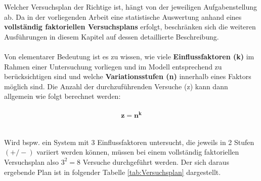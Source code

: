 \documentclass[
fontsize=10pt, 
listof = totoc,
parskip = half	
]{report}
\begin{document}
\noindent Welcher Versuchsplan der Richtige ist, hängt von der jeweiligen Aufgabenstellung ab. Da in der vorliegenden Arbeit eine statistische Auswertung anhand eines \textbf{vollständig faktoriellen Versuchsplans} erfolgt, beschränken sich die weiteren Ausführungen in diesem Kapitel auf dessen detaillierte Beschreibung.
\\\\
\noindent Von elementarer Bedeutung ist es zu wissen, wie viele \textbf{Einflussfaktoren (k)} im Rahmen einer Untersuchung vorliegen und im Modell entsprechend zu berücksichtigen sind und welche \textbf{Variationsstufen (n)} innerhalb eines Faktors möglich sind. Die Anzahl der durchzuführenden Versuche (z) kann dann allgemein wie folgt berechnet werden:
\\\\
\begin{equation}
	\mathbf{z = n^k}
\end{equation}
\\\\
\noindent Wird bspw. ein System mit 3 Einflussfaktoren untersucht, die jeweils in 2 Stufen $(+/-)$ variiert werden können, müssen bei einem vollständig faktoriellen Versuchsplan also $3^2 = 8$ Versuche durchgeführt werden. Der sich daraus ergebende Plan ist in folgender Tabelle \ref{tab:Versuchsplan} dargestellt.
\end{document}
